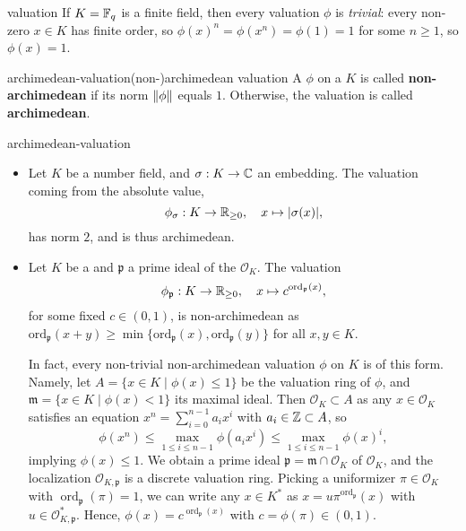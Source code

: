 \begin{example}{valuation}
    If $K = \mathbb{F}_q$ is a finite field, then every valuation $\phi$ is \textit{trivial}: every non-zero $x \in K$ has finite order, so $\phi(x)^n = \phi(x^n) = \phi(1) = 1$ for some $n \ge 1$, so $\phi(x) = 1$.
\end{example}

\begin{topic}{archimedean-valuation}{(non-)archimedean valuation}
    A  $\phi$ on a  $K$ is called \textbf{non-archimedean} if its norm $\left\|\phi\right\|$ equals $1$. Otherwise, the valuation is called \textbf{archimedean}.
\end{topic}

\begin{example}{archimedean-valuation}
    \begin{itemize}
        \item Let $K$ be a number field, and $\sigma : K \to \mathbb{C}$ an embedding. The valuation coming from the absolute value,
        \[ \phi_\sigma : K \to \mathbb{R}_{\ge 0}, \quad x \mapsto |\sigma(x)| , \]
        has norm $2$, and is thus archimedean.
        \item Let $K$ be a  and $\mathfrak{p}$ a prime ideal of the  $\mathcal{O}_K$. The valuation
        \[ \phi_\mathfrak{p} : K \to \mathbb{R}_{\ge 0}, \quad x \mapsto c^{\text{ord}_\mathfrak{p}(x)} , \]
        for some fixed $c \in (0, 1)$, is non-archimedean as $\text{ord}_\mathfrak{p}(x + y) \ge \min \{ \text{ord}_\mathfrak{p}(x), \text{ord}_\mathfrak{p}(y) \}$ for all $x, y \in K$.
        
        In fact, every non-trivial non-archimedean valuation $\phi$ on $K$ is of this form. Namely, let $A = \{ x \in K \mid \phi(x) \le 1 \}$ be the valuation ring of $\phi$, and $\mathfrak{m} = \{ x \in K \mid \phi(x) < 1 \}$ its maximal ideal. Then $\mathcal{O}_K \subset A$ as any $x \in \mathcal{O}_K$ satisfies an equation $x^n = \sum_{i = 0}^{n - 1} a_i x^i$ with $a_i \in \mathbb{Z} \subset A$, so
        \[ \phi(x^n) \le \max_{1 \le i \le n - 1} \phi(a_i x^i) \le \max_{1 \le i \le n - 1} \phi(x)^i , \]
        implying $\phi(x) \le 1$. We obtain a prime ideal $\mathfrak{p} = \mathfrak{m} \cap \mathcal{O}_K$ of $\mathcal{O}_K$, and the localization $\mathcal{O}_{K, \mathfrak{p}}$ is a discrete valuation ring. Picking a uniformizer $\pi \in \mathcal{O}_K$ with $\operatorname{ord}_\mathfrak{p}(\pi) = 1$, we can write any $x \in K^*$ as $x = u \pi^{\operatorname{ord}_\mathfrak{p}}(x)$ with $u \in \mathcal{O}_{K, \mathfrak{p}}^*$. Hence, $\phi(x) = c^{\operatorname{ord}_\mathfrak{p}(x)}$ with $c = \phi(\pi) \in (0, 1)$.
    \end{itemize}
\end{example}

